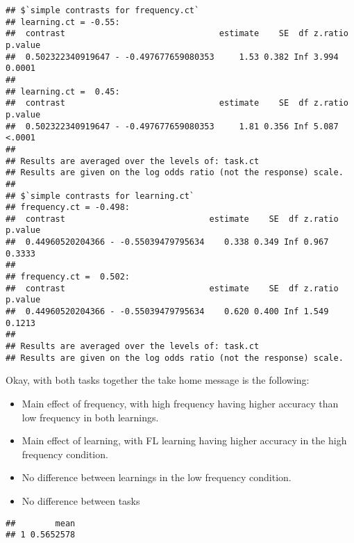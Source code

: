 \documentclass[
]{article}
\newenvironment{Shaded}{\begin{snugshade}}{\end{snugshade}}
\newcommand{\DataTypeTok}[1]{\textcolor[rgb]{0.13,0.29,0.53}{#1}}
\newcommand{\KeywordTok}[1]{\textcolor[rgb]{0.13,0.29,0.53}{\textbf{#1}}}
\newcommand{\NormalTok}[1]{#1}
\newcommand{\OperatorTok}[1]{\textcolor[rgb]{0.81,0.36,0.00}{\textbf{#1}}}
\newcommand{\StringTok}[1]{\textcolor[rgb]{0.31,0.60,0.02}{#1}}
\begin{document}
\begin{verbatim}
## $`simple contrasts for frequency.ct`
## learning.ct = -0.55:
##  contrast                               estimate    SE  df z.ratio p.value
##  0.502322340919647 - -0.497677659080353     1.53 0.382 Inf 3.994   0.0001 
## 
## learning.ct =  0.45:
##  contrast                               estimate    SE  df z.ratio p.value
##  0.502322340919647 - -0.497677659080353     1.81 0.356 Inf 5.087   <.0001 
## 
## Results are averaged over the levels of: task.ct 
## Results are given on the log odds ratio (not the response) scale. 
## 
## $`simple contrasts for learning.ct`
## frequency.ct = -0.498:
##  contrast                             estimate    SE  df z.ratio p.value
##  0.44960520204366 - -0.55039479795634    0.338 0.349 Inf 0.967   0.3333 
## 
## frequency.ct =  0.502:
##  contrast                             estimate    SE  df z.ratio p.value
##  0.44960520204366 - -0.55039479795634    0.620 0.400 Inf 1.549   0.1213 
## 
## Results are averaged over the levels of: task.ct 
## Results are given on the log odds ratio (not the response) scale.
\end{verbatim}

Okay, with both tasks together the take home message is the following:

\begin{itemize}
\item
  Main effect of frequency, with high frequency having higher accuracy
  than low frequency in both learnings.
\item
  Main effect of learning, with FL learning having higher accuracy in
  the high frequency condition.
\item
  No difference between learnings in the low frequency condition.
\item
  No difference between tasks
\end{itemize}

\begin{Shaded}
\end{Shaded}

\begin{verbatim}
##        mean
## 1 0.5652578
\end{verbatim}
\end{document}
